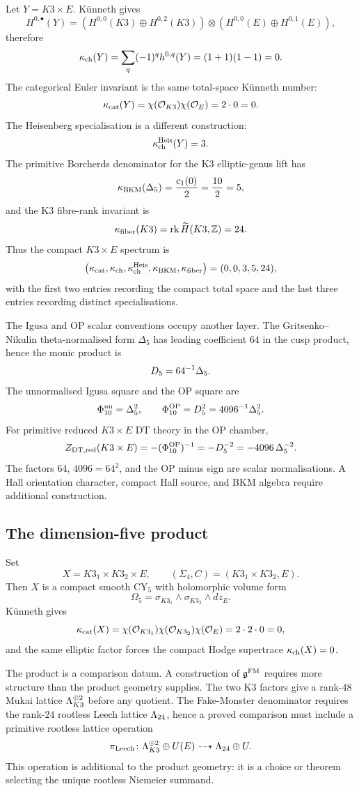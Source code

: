 Let $Y=K3\times E$. K\"unneth gives
\[
  H^{0,\bullet}(Y)
  =(H^{0,0}(K3)\oplus H^{0,2}(K3))
   \otimes (H^{0,0}(E)\oplus H^{0,1}(E)),
\]
therefore
\[
  \kappa_{\mathrm{ch}}(Y)=\sum_q(-1)^q h^{0,q}(Y)
  =(1+1)(1-1)=0 .
\]
The categorical Euler invariant is the same total-space K\"unneth
number:
\[
  \kappa_{\mathrm{cat}}(Y)=\chi(\mathcal O_{K3})\chi(\mathcal O_E)=2\cdot0=0 .
\]
The Heisenberg specialisation is a different construction:
\[
  \kappa_{\mathrm{ch}}^{\mathrm{Heis}}(Y)=3 .
\]
The primitive Borcherds denominator for the K3 elliptic-genus lift has
\[
  \kappa_{\mathrm{BKM}}(\Delta_5)=\frac{c_1(0)}2=\frac{10}{2}=5,
\]
and the K3 fibre-rank invariant is
\[
  \kappa_{\mathrm{fiber}}(K3)=\operatorname{rk}\widetilde H(K3,\mathbb{Z})=24 .
\]
Thus the compact $K3\times E$ spectrum is
\[
  \bigl(\kappa_{\mathrm{cat}},\kappa_{\mathrm{ch}},\kappa_{\mathrm{ch}}^{\mathrm{Heis}},\kappa_{\mathrm{BKM}},\kappa_{\mathrm{fiber}}\bigr)
  =(0,0,3,5,24),
\]
with the first two entries recording the compact total space and the
last three entries recording distinct specialisations.

The Igusa and OP scalar conventions occupy another layer. The
Gritsenko--Nikulin theta-normalised form $\Delta_5$ has leading
coefficient $64$ in the cusp product, hence the monic product is
\[
  D_5=64^{-1}\Delta_5 .
\]
The unnormalised Igusa square and the OP square are
\[
  \Phi_{10}^{\mathrm{un}}=\Delta_5^2,\qquad
  \Phi_{10}^{\mathrm{OP}}=D_5^2=4096^{-1}\Delta_5^2 .
\]
For primitive reduced $K3\times E$ DT theory in the OP chamber,
\[
  Z_{\mathrm{DT},\mathrm{red}}(K3\times E)
  =-(\Phi_{10}^{\mathrm{OP}})^{-1}
  =-D_5^{-2}
  =-4096\,\Delta_5^{-2}.
\]
The factors $64$, $4096=64^2$, and the OP minus sign are scalar
normalisations. A Hall orientation character, compact Hall source, and
BKM algebra require additional construction.

\subsection*{The dimension-five product}
\label{subsec:k3k3e-product-datum}

Set
\[
  X=K3_1\times K3_2\times E,
  \qquad
  (\Sigma_4,C)=(K3_1\times K3_2,E).
\]
Then $X$ is a compact smooth CY$_5$ with holomorphic volume form
\[
  \Omega_5=\sigma_{K3_1}\wedge\sigma_{K3_2}\wedge dz_E .
\]
K\"unneth gives
\[
  \kappa_{\mathrm{cat}}(X)
  =\chi(\mathcal O_{K3_1})\chi(\mathcal O_{K3_2})\chi(\mathcal O_E)
  =2\cdot2\cdot0=0,
\]
and the same elliptic factor forces the compact Hodge supertrace
$\kappa_{\mathrm{ch}}(X)=0$.

The product is a comparison datum. A construction of $\mathfrak{g}^{\mathrm{FM}}$ requires
more structure than the product geometry supplies. The two K3 factors
give a rank-$48$ Mukai lattice
$\Lambda_{K3}^{\oplus2}$ before any quotient. The Fake-Monster denominator
requires the rank-$24$ rootless Leech lattice $\Lambda_{24}$, hence a proved
comparison must include a primitive rootless lattice operation
\[
  \pi_{\mathrm{Leech}}\colon
  \Lambda_{K3}^{\oplus2}\oplus U(E)\dashrightarrow \Lambda_{24}\oplus U .
\]
This operation is additional to the product geometry: it is a choice or
theorem selecting the unique rootless Niemeier summand.

